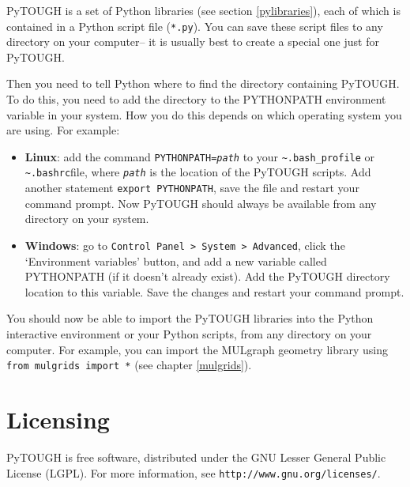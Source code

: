 PyTOUGH is a set of Python libraries (see section \ref{pylibraries}), each of which is contained in a Python script file (\texttt{*.py}).  You can save these script files to any directory on your computer-- it is usually best to create a special one just for PyTOUGH.

Then you need to tell Python where to find the directory containing PyTOUGH.  To do this, you need to add the directory to the PYTHONPATH environment variable in your system.  How you do this depends on which operating system you are using.  For example:

\begin{itemize}

\item \textbf{Linux}: add the command \texttt{PYTHONPATH=\emph{path}} to your \texttt{\textasciitilde.bash\_profile} or \texttt{\textasciitilde.bashrc}file, where \texttt{\emph{path}} is the location of the PyTOUGH scripts.  Add another statement \texttt{export PYTHONPATH}, save the file and restart your command prompt.  Now PyTOUGH should always be available from any directory on your system.

\item \textbf{Windows}: go to \texttt{Control Panel > System > Advanced}, click the `Environment variables' button, and add a new variable called PYTHONPATH (if it doesn't already exist).  Add the PyTOUGH directory location to this variable.  Save the changes and restart your command prompt.

\end{itemize}

You should now be able to import the PyTOUGH libraries into the Python interactive environment or your Python scripts, from any directory on your computer.  For example, you can import the MULgraph geometry library using \texttt{from mulgrids import *} (see chapter \ref{mulgrids}).

\section{Licensing}

PyTOUGH is free software, distributed under the GNU Lesser General Public License (LGPL).  For more information, see \texttt{http://www.gnu.org/licenses/}.
